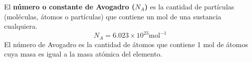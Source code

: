 \begin{warncard}[adjusted title={Constante de Abogadro}]
    El \textbf{número o constante de Avogadro ($N_A$)} es la cantidad de partículas (moléculas, átomos o partículas) que contiene un mol de una sustancia cualquiera.
    \[ N_A=6.023 \times 10^{23} \text{mol}^{-1}\]
    El número de Avogadro es la cantidad de átomos que contiene 1 mol de átomos cuya masa es igual a la masa atómica del elemento.
\end{warncard}